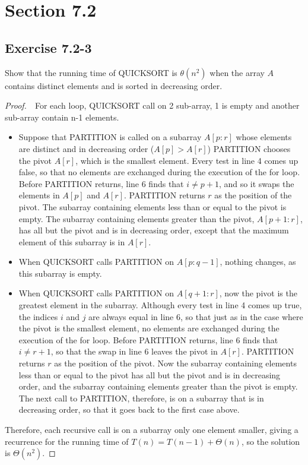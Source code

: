 \documentclass{article}
\begin{document}
\section*{Section 7.2}
\subsection*{Exercise 7.2-3}
%
Show that the running time of QUICKSORT is $\theta (n^2)$ when the array $A$ contains distinct elements and is sorted in decreasing order.

\begin{proof}
    $ $\newline
    $ $\newline
    For each loop, QUICKSORT call on 2 sub-array, 1 is empty and another sub-array contain n-1 elements.
    
    \begin{itemize}
    \item 
        Suppose that PARTITION is called on a subarray $A[p:r]$ 
        whose elements are distinct and in decreasing order ($A[p] > A[r]$)
        PARTITION chooses the pivot $A[r]$, which is the smallest element.
        Every test in line 4 comes up false, so that no elements are exchanged during the execution of the for loop. 
        Before PARTITION returns, line 6 finds that $i \neq p + 1$, 
        and so it swaps the elements in $A[p]$ and $A[r]$. 
        PARTITION returns $r$ as the position of the pivot. 
        The subarray containing elements less than or equal to the pivot is empty. 
        The subarray containing elements greater than the pivot, $A[p+1:r]$, 
        has all but the pivot and is in decreasing order, 
        except that the maximum element of this subarray is in $A[r]$.
    
    \item 
        When QUICKSORT calls PARTITION on $A[p:q-1]$, nothing changes, 
        as this subarray is empty. 
    \item 
        When QUICKSORT calls PARTITION on $A[q+1:r]$, now the pivot is the greatest element in the subarray. 
        Although every test in line 4 comes up true, the indices $i$ and $j$ are always equal in line 6, 
        so that just as in the case where the pivot is the smallest element, 
        no elements are exchanged during the execution of the for loop. 
        Before PARTITION returns, line 6 finds that $i \neq r + 1$, 
        so that the swap in line 6 leaves the pivot in $A[r]$. 
        PARTITION returns $r$ as the position of the pivot. 
        Now the subarray containing elements less than or equal to the pivot has all but the pivot and is in decreasing order, 
        and the subarray containing elements greater than the pivot is empty. 
        The next call to PARTITION, therefore, is on a subarray that is in decreasing order, 
        so that it goes back to the first case above.
    
    \end{itemize}
    Therefore, each recursive call is on a subarray only one element smaller, 
    giving a recurrence for the running time of $T(n) = T(n-1) + \Theta(n)$, 
    so the solution is $\Theta(n^2)$.
\end{proof}
\end{document}

